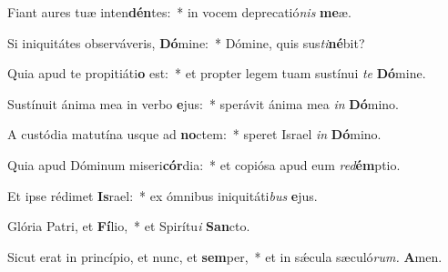 \item Fiant aures tuæ inten\textbf{dén}tes:~* in vocem deprecatió\textit{nis} \textbf{me}æ.
\item Si iniquitátes observáveris, \textbf{Dó}mine:~* Dómine, quis sus\hspace{0.02em}\textit{ti}\textbf{né}bit?
\item Quia apud te propitiáti\textbf{o} est:~* et propter legem tuam sustínui \textit{te} \textbf{Dó}mine.
\item Sustínuit ánima mea in verbo \textbf{e}jus:~* sperávit ánima mea \textit{in} \textbf{Dó}mino.
\item A custódia matutína usque ad \textbf{no}ctem:~* speret Israel \textit{in} \textbf{Dó}mino.
\item Quia apud Dóminum miseri\textbf{cór}dia:~* et copiósa apud eum \textit{red}\textbf{ém}ptio.
\item Et ipse rédimet \textbf{Is}rael:~* ex ómnibus iniquitáti\hspace*{0.02em}\textit{bus} \textbf{e}jus.
\item Glória Patri, et \textbf{Fí}lio,~* et Spirítu\hspace{0.03em}\textit{i} \textbf{San}cto.
\item Sicut erat in princípio, et nunc, et \textbf{sem}per,~* et in sǽcula sæculó\textit{rum.} \textbf{A}men.